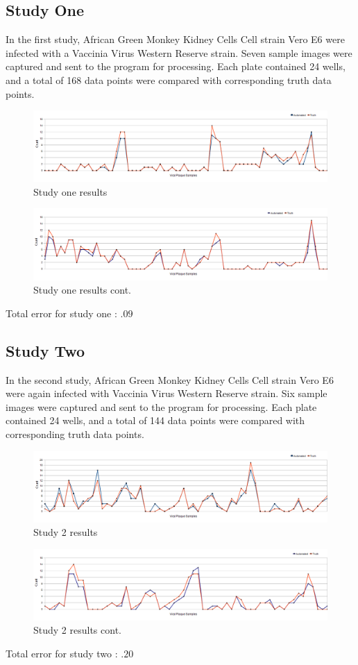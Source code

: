 \documentclass[11pt,final,twocolumn]{IEEEtran}
\begin{document}
\subsection{Study One}
In the first study, African Green Monkey Kidney Cells  Cell strain Vero E6 were infected with a Vaccinia Virus Western Reserve strain. Seven sample images were captured and sent to the program for processing. Each plate contained 24 wells, and a total of 168 data points were compared with corresponding truth data points.

\begin{figure}[H]
\centering
\includegraphics[width=.4\textwidth]{Study1Results.png}
\caption{Study one results}
\label{fig:study1Results}
\end{figure}

\begin{figure}[H]
\centering
\includegraphics[width=.4\textwidth]{Study1ResultsCont.png}
\caption{Study one results cont.}
\label{fig:study1ResultsCont}
\end{figure}

Total error for study one : $.09$ 


\subsection{Study Two}
In the second study, African Green Monkey Kidney Cells  Cell strain Vero E6 were again infected with Vaccinia Virus Western Reserve strain. Six sample images were captured and sent to the program for processing. Each plate contained 24 wells, and a total of 144 data points were compared with corresponding truth data points.

\begin{figure}[H]
\centering
\includegraphics[width=.4\textwidth]{Study2Results.png}
\caption{Study 2 results}
\label{fig:study2Results}
\end{figure}

\begin{figure}[H]
\centering
\includegraphics[width=.4\textwidth]{Study2ResultsCont.png}
\caption{Study 2 results cont.}
\label{fig:study2ResultsCont}
\end{figure}
Total error for study two : $.20$ 
\end{document}
